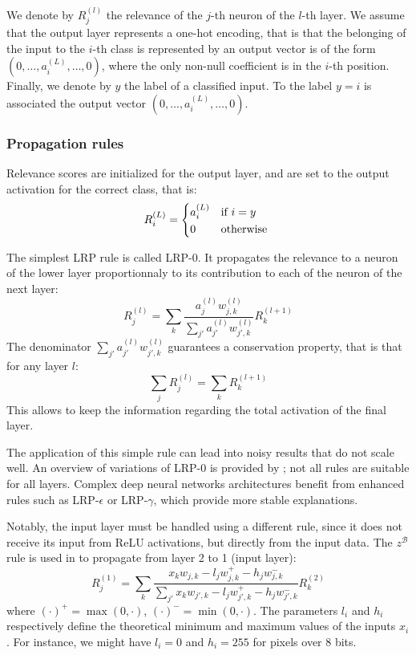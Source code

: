 \documentclass{../cs-classes/cs-classes}
\begin{document}
We denote by $R^{(l)}_j$ the relevance of the $j$-th neuron of the $l$-th layer. We assume that the output layer represents a one-hot encoding, that is that the belonging of the input to the $i$-th class is represented by an output vector is of the form $(0, \dots, a^{(L)}_i, \dots, 0)$, where the only non-null coefficient is in the $i$-th position. Finally, we denote by $y$ the label of a classified input. To the label $y=i$ is associated the output vector $(0, \dots, a^{(L)}_i, \dots, 0)$.

\subsubsection{Propagation rules}
Relevance scores are initialized for the output layer, and are set to the output activation for the correct class, that is:
\begin{equation}
    R^{(L)}_i = \begin{cases*}
        a^{(L)}_i & if $i = y$\\
        0 & otherwise
    \end{cases*}
\end{equation}

The simplest LRP rule is called LRP-0. It propagates the relevance to a neuron of the lower layer proportionnaly to its contribution to each of the neuron of the next layer:
\begin{equation}
    R^{(l)}_j = \sum_{k}\frac{a^{(l)}_jw^{(l)}_{j, k}}{\sum_{j'}a^{(l)}_{j'}w^{(l)}_{j', k}} R^{(l+1)}_k
\end{equation}
The denominator $\sum_{j'}a^{(l)}_{j'}w^{(l)}_{j', k}$ guarantees a conservation property, that is that for any layer $l$:
\begin{equation*}
    \sum_j R^{(l)}_j = \sum_k R^{(l+1)}_k
\end{equation*}
This allows to keep the information regarding the total activation of the final layer.

The application of this simple rule can lead into noisy results that do not scale well. An overview of variations of LRP-0 is provided by \cite{montavon-lrp}; not all rules are suitable for all layers. Complex deep neural networks architectures benefit from enhanced rules such as LRP-$\epsilon$ or LRP-$\gamma$, which provide more stable explanations.

Notably, the input layer must be handled using a different rule, since it does not receive its input from ReLU activations, but directly from the input data. The $z^\mathcal{B}$ rule is used in \cite{montavon-lrp} to propagate from layer 2 to 1 (input layer):
\begin{equation}
    R^{(1)}_j = \sum_{k} \frac{x_kw_{j, k} - l_jw^+_{j, k} - h_jw_{j, k}^-}{\sum_{j'}x_kw_{j', k} - l_jw^+_{j', k} - h_jw_{j', k}^-} R^{(2)}_k
\end{equation}
where $(\cdot)^+=\max(0, \cdot)$, $(\cdot)^-=\min(0, \cdot)$. The parameters $l_i$ and $h_i$ respectively define the theoretical minimum and maximum values of the inputs $x_i$. For instance, we might have $l_i=0$ and $h_i=255$ for pixels over 8 bits.
\end{document}
